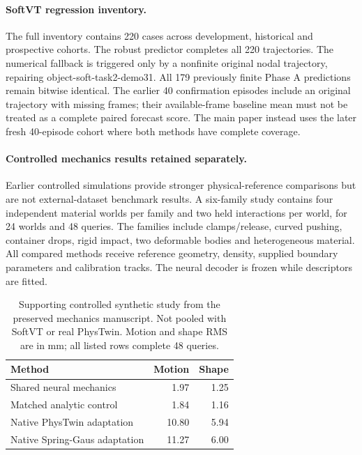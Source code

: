 \documentclass[10pt,twocolumn,letterpaper]{article}
\begin{document}
\paragraph{SoftVT regression inventory.}
The full inventory contains 220 cases across development, historical and prospective cohorts. The robust predictor completes all 220 trajectories. The numerical fallback is triggered only by a nonfinite original nodal trajectory, repairing object-soft-task2-demo31. All 179 previously finite Phase A predictions remain bitwise identical. The earlier 40 confirmation episodes include an original trajectory with missing frames; their available-frame baseline mean must not be treated as a complete paired forecast score. The main paper instead uses the later fresh 40-episode cohort where both methods have complete coverage.

\paragraph{Controlled mechanics results retained separately.}
Earlier controlled simulations provide stronger physical-reference comparisons but are not external-dataset benchmark results. A six-family study contains four independent material worlds per family and two held interactions per world, for 24 worlds and 48 queries. The families include clamps/release, curved pushing, container drops, rigid impact, two deformable bodies and heterogeneous material. All compared methods receive reference geometry, density, supplied boundary parameters and calibration tracks. The neural decoder is frozen while descriptors are fitted.

\begin{table}[h]
\centering\small\setlength{\tabcolsep}{3pt}
\caption{Supporting controlled synthetic study from the preserved mechanics manuscript. Not pooled with SoftVT or real PhysTwin. Motion and shape RMS are in mm; all listed rows complete 48 queries.}
\begin{tabular}{lrr}\toprule
Method & Motion & Shape\\\midrule
Shared neural mechanics &1.97&1.25\\
Matched analytic control &1.84&1.16\\
Native PhysTwin adaptation &10.80&5.94\\
Native Spring-Gaus adaptation &11.27&6.00\\\bottomrule
\end{tabular}
\end{table}
\end{document}
